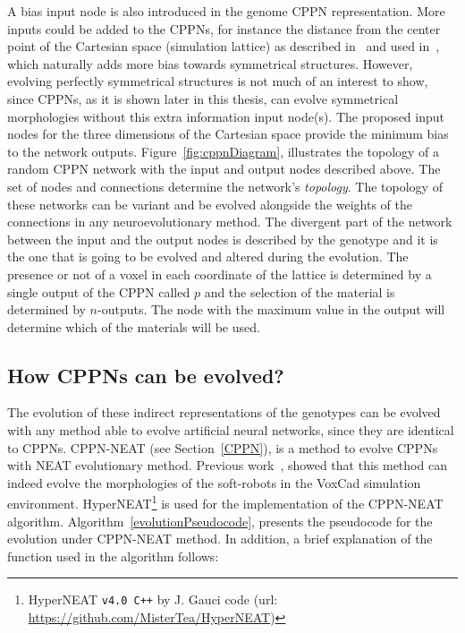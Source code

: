 A bias input node is also introduced in the genome CPPN representation. More inputs could be added to the CPPNs, for instance the distance from the center point of the Cartesian space (simulation lattice) as described in~\citep{stanley2007compositional} and used in~\citep{cheney2013unshackling}, which naturally adds more bias towards symmetrical structures. However, evolving perfectly symmetrical structures is not much of an interest to show, since CPPNs, as it is shown later in this thesis, can evolve symmetrical morphologies without this extra information input node(s). The proposed input nodes for the three dimensions of the Cartesian space provide the minimum bias to the network outputs. Figure~\ref{fig:cppnDiagram}, illustrates the topology of a random CPPN network with the input and output nodes described above. The set of nodes and connections determine the network's \emph{topology}. The topology of these networks can be variant and be evolved alongside the weights of the connections in any neuroevolutionary method. The divergent part of the network between the input and the output nodes is described by the genotype and it is the one that is going to be evolved and altered during the evolution. The presence or not of a voxel in each coordinate of the lattice is determined by a single output of the CPPN called $p$ and the selection of the material is determined by $n$-outputs. The node with the maximum value in the output will determine which of the materials will be used.

\subsection{How CPPNs can be evolved?}

The evolution of these indirect representations of the genotypes can be evolved with any method able to evolve artificial neural networks, since they are identical to CPPNs. CPPN-NEAT (see Section~\ref{CPPN}), is a method to evolve CPPNs with NEAT evolutionary method. Previous work~\citep{cheney2013unshackling}, showed that this method can indeed evolve the morphologies of the soft-robots in the VoxCad simulation environment. HyperNEAT\footnote{HyperNEAT \texttt{v4.0 C++} by J. Gauci code (url: \url{https://github.com/MisterTea/HyperNEAT})} is used for the implementation of the CPPN-NEAT algorithm. Algorithm~\ref{evolutionPseudocode}, presents the pseudocode for the evolution under CPPN-NEAT method. In addition, a brief explanation of the function used in the algorithm follows:


